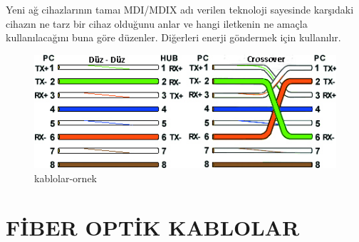 Yeni ağ cihazlarının tamaı MDI/MDIX adı verilen teknoloji sayesinde karşıdaki cihazın ne tarz bir cihaz olduğunu anlar ve hangi iletkenin ne amaçla kullanılacağını buna göre  düzenler. 
Diğerleri enerji göndermek için kullanılır.\\

\begin{figure}[!ht]
  \includegraphics{images/ethcable}
 \caption{kablolar-ornek}
 \label{fig:caprazduz_kablo_ornek_gosterim}
\end{figure}
\section*{FİBER OPTİK KABLOLAR}
